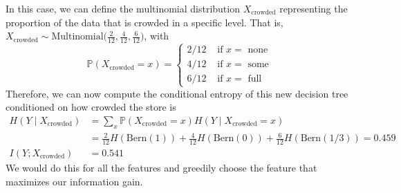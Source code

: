 \documentclass{article}
\begin{document}
\begin{example}
    In this case, we can define the multinomial distribution $X_{\mathrm{crowded}}$ representing the proportion of the data that is crowded in a specific level. That is, $X_{\mathrm{crowded}} \sim \mathrm{Multinomial}(\frac{2}{12}, \frac{4}{12}, \frac{6}{12} \big)$, with 
    \begin{equation}
      \mathbb{P}(X_{\mathrm{crowded}} = x) = \begin{cases} 2/12 & \text{ if } x = \text{ none} \\ 4/12 & \text{ if } x = \text{ some} \\ 6/12 & \text{ if } x = \text{ full} \end{cases}
    \end{equation}
    Therefore, we can now compute the conditional entropy of this new decision tree conditioned on how crowded the store is 
    \begin{align}
      H(Y \mid X_{\mathrm{crowded}}) & = \sum_x \mathbb{P}(X_{\mathrm{crowded}} = x) H(Y \mid X_{\mathrm{crowded}} = x) \\
      & = \frac{2}{12} H(\mathrm{Bern}(1)) + \frac{4}{12} H(\mathrm{Bern}(0)) + \frac{6}{12} H(\mathrm{Bern}(1/3)) = 0.459 \\
      I(Y; X_{\mathrm{crowded}}) & = 0.541
    \end{align}
    We would do this for all the features and greedily choose the feature that maximizes our information gain. 
  \end{example}
\end{document}
